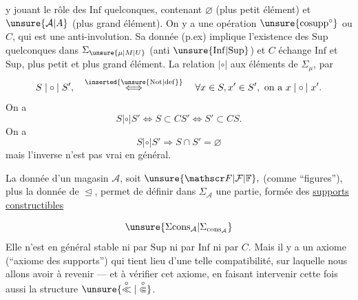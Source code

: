 
y jouant le rôle des $\mathrm{Inf}$ quelconques, contenant $\varnothing$ (plus petit élément) et $\unsure{\mathcal A|A}$ (plus grand élément). On y a une opération $\unsure{\mathrm{cosupp}^{\circ}}$ ou $C$, qui est une anti-involution. Sa donnée  (p.ex) implique l'existence des $\mathrm{Sup}$ quelconques dans $\Sigma_{\unsure{\mu|M|U}}$ (anti $\unsure{\mathrm{Inf}|\mathrm{Sup}}$) et $C$ échange $\mathrm{Inf}$ et $\mathrm{Sup}$, plus petit et plus grand élément. La relation $\mathrel{|\circ|}$   aux éléments de $\Sigma_\mu$, par
\[
S\mathrel{|\circ|}S',\quad \overset{\inserted{\unsure{\mathrm{Not}|\mathrm{def}}}}{\Longleftrightarrow}\quad \forall x\in S,x'\in S',\ \text{on a }x\mathrel{|\circ|}x'.
\]
On a
\[
S\mathrel{|\circ|}S'\Longleftrightarrow S\subset CS'\Longleftrightarrow S'\subset CS.
\]
On a
\[
S\mathrel{|\circ|}S'\Longrightarrow S\cap S'=\varnothing
\]
mais l'inverse n'est pas vrai en général.


La donnée d'un magasin  $\mathcal A$, soit $\unsure{\mathscr F|\mathcal F|\mathbb F},$ (comme ``figures''),  plus la donnée de $\trianglelefteq$, permet de définir dans $\Sigma_{\mathcal A}$ une partie, formée des \uline{supports constructibles}

\[
\unsure{\Sigma\mathrm{cons}_{\mathcal A}|\Sigma_{\mathrm{cons}_{\mathcal A}}}
\]
Elle n'est  en général stable ni par $\mathrm{Sup}$ ni par $\mathrm{Inf}$ ni par $C$. Mais il y a un axiome (``axiome des supports'') qui tient lieu d'une telle compatibilité, sur laquelle nous allons avoir à revenir --- et à vérifier  cet axiome, en faisant intervenir cette fois aussi la structure $\unsure{\overset{\circ}{\ll}|\overset{\circ}{\Subset}}$.

